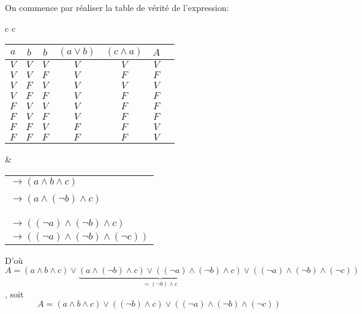 \documentclass{scrartcl}
\begin{document}
					On commence par réaliser la table de vérité de l'expression:
					\begin{center}
					\begin{tabular}{c c}
					\begin{tabular}{| c c c | c | c | c | c }
						\hline
						$a$ & $b$ & $b$   &  $(a\vee b)$ & $(c \wedge a)$ & $A$ \\
						\hline
						$V$ & $V$ & $V$   &     $V$      &     $V$        & $V$ \\
						\hline
						$V$ & $V$ & $F$   &     $V$      &     $F$        & $F$ \\
						\hline
						$V$ & $F$ & $V$   &     $V$      &     $V$        & $V$ \\
						\hline
						$V$ & $F$ & $F$   &     $V$      &     $F$        & $F$ \\
						\hline
						$F$ & $V$ & $V$   &     $V$      &     $F$        & $F$ \\
						\hline
						$F$ & $V$ & $F$   &     $V$      &     $F$        & $F$ \\
						\hline
						$F$ & $F$ & $V$   &     $F$      &     $F$        & $V$ \\
						\hline
						$F$ & $F$ & $F$   &     $F$      &     $F$        & $V$ \\
						\hline
					\end{tabular}
					& \begin{tabular}{l}
					\\ $\rightarrow (a \wedge b \wedge c)$ \\ \\ 
					$\rightarrow (a \wedge (\neg b) \wedge c)$ \\ \\ \\ \\ 
					$\rightarrow ((\neg a) \wedge (\neg b) \wedge c)$ \\ 
					$\rightarrow ((\neg a) \wedge (\neg b) \wedge (\neg c))$ 
					\end{tabular}
					\end{tabular}
					\end{center}
					D'où $A = (a \wedge b \wedge c) \vee 
					\underbrace{(a \wedge (\neg b) \wedge c) \vee ((\neg a) \wedge (\neg b) \wedge c)}_{= (\neg b) \wedge c} 
					\vee ((\neg a) \wedge (\neg b) \wedge (\neg c))$, soit 
					\[ 
						\boxed{A = (a \wedge b \wedge c) \vee ((\neg b) \wedge c) \vee ((\neg a) \wedge (\neg b) \wedge (\neg c))}
					\]
\end{document}
